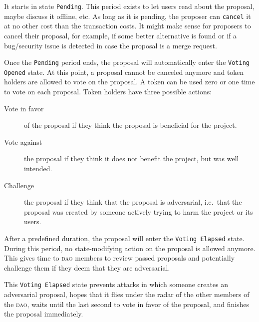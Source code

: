 It starts in state \texttt{Pending}.
This period exists to let users read about the proposal, maybe discuss it offline, etc.
As long as it is pending, the proposer can \texttt{cancel} it at no other cost than the transaction costs.
It might make sense for proposers to cancel their proposal, for example, if some better alternative is found or if a bug/security issue is detected in case the proposal is a merge request.

Once the \texttt{Pending} period ends, the proposal will automatically%
 enter the \texttt{Voting Opened} state.
At this point, a proposal cannot be canceled anymore and token holders are allowed to vote on the proposal.
A token can be used zero or one time to vote on each proposal.
Token holders have three possible actions:

\begin{description}
  \item[Vote in favor] of the proposal if they think the proposal is beneficial for the project.
  \item[Vote against] the proposal if they think it does not benefit the project, but was well intended.
  \item[Challenge] the proposal if they think that the proposal is adversarial, i.e.\ that the proposal was created by someone actively trying to harm the project or its users.
\end{description}

After a predefined duration, the proposal will enter the \texttt{Voting Elapsed} state.
During this period, no state-modifying action on the proposal is allowed anymore.
This gives time to \textsc{dao} members to review passed proposals and potentially challenge them if they deem that they are adversarial.

This \texttt{Voting Elapsed} state prevents attacks in which someone creates an adversarial proposal, hopes that it flies under the radar of the other members of the \textsc{dao}, waits until the last second to vote in favor of the proposal, and finishes the proposal immediately.

